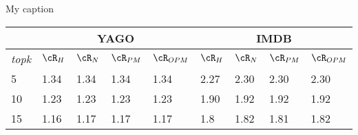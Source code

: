 
\centering
\caption{My caption}
\label{my-label}
\begin{tabular}{l|l|l|l|l|l|l|l|l|}
\cline{2-9}
                           & \multicolumn{4}{c|}{YAGO}        & \multicolumn{4}{c|}{IMDB}        \\ \hline
\multicolumn{1}{|l|}{\textit{topk}} & $\cR_{H}$ & $\cR_{N}$ & $\cR_{PM}$ & $\cR_{OPM}$ & $\cR_{H}$ & $\cR_{N}$ & $\cR_{PM}$ & $\cR_{OPM}$ \\ \hline
\multicolumn{1}{|l|}{5}    &   1.34    &   1.34    &    1.34    &    1.34     &   2.27    &   2.30    &   2.30     &  2.30       \\ \hline
\multicolumn{1}{|l|}{10}   &    1.23   &   1.23    &    1.23    &    1.23     &   1.90    &   1.92    &    1.92    &  1.92       \\ \hline
\multicolumn{1}{|l|}{15}   &   1.16    &   1.17    &    1.17    &    1.17     &   1.8    &   1.82    &   1.81     &   1.82      \\ \hline
\end{tabular}

